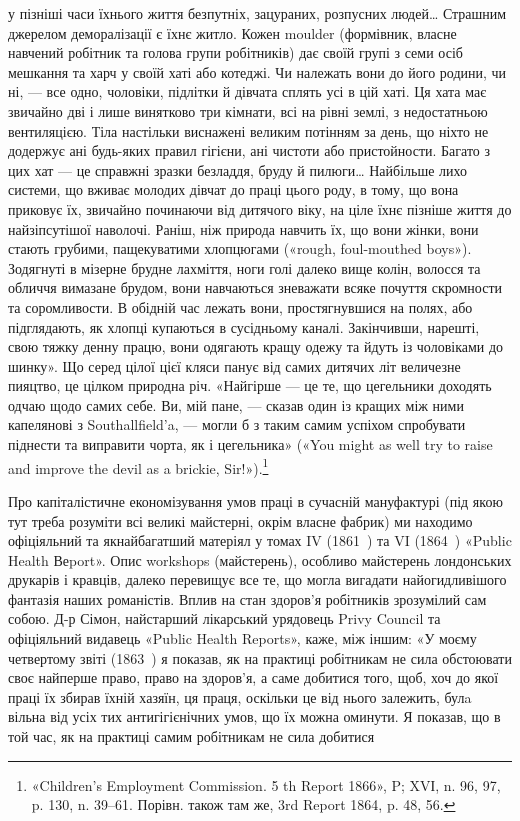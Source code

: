 \parcont{}  %
у пізніші часи їхнього життя безпутніх, зацураних, розпусних
людей\dots{} Страшним джерелом деморалізації є їхнє житло. Кожен
moulder (формівник, власне навчений робітник та голова групи
робітників) дає своїй групі з семи осіб мешкання та харч у своїй
хаті або котеджі. Чи належать вони до його родини, чи ні, — все
одно, чоловіки, підлітки й дівчата сплять усі в цій хаті. Ця хата
має звичайно дві і лише винятково три кімнати, всі на рівні землі,
з недостатньою вентиляцією. Тіла настільки виснажені великим
потінням за день, що ніхто не додержує ані будь-яких правил
гігієни, ані чистоти або пристойности. Багато з цих хат — це
справжні зразки безладдя, бруду й пилюги\dots{} Найбільше лихо
системи, що вживає молодих дівчат до праці цього роду, в тому,
що вона приковує їх, звичайно починаючи від дитячого віку, на
ціле їхнє пізніше життя до найзіпсутішої наволочі. Раніш, ніж
природа навчить їх, що вони жінки, вони стають грубими, пащекуватими
хлопцюгами («rough, foul-mouthed boys»). Зодягнуті
в мізерне брудне лахміття, ноги голі далеко вище колін, волосся
та обличчя вимазане брудом, вони навчаються зневажати всяке
почуття скромности та соромливости. В обідній час лежать вони,
простягнувшися на полях, або підглядають, як хлопці купаються
в сусідньому каналі. Закінчивши, нарешті, свою тяжку денну
працю, вони одягають кращу одежу та йдуть із чоловіками до
шинку». Що серед цілої цієї кляси панує від самих дитячих літ
величезне пияцтво, це цілком природна річ. «Найгірше — це те,
що цегельники доходять одчаю щодо самих себе. Ви, мій пане, —
сказав один із кращих між ними капелянові з Southallfield’a, —
могли б з таким самим успіхом спробувати піднести та виправити
чорта, як і цегельника» («You might as well try to raise and
improve the devil as a brickie, Sir!»).\footnote{
«Children’s Employment Commission. 5 th Report 1866», P; XVІ,
n. 96, 97, p. 130, n. 39--61. Порівн. також там же, 3rd Report 1864,
p. 48, 56.
}

Про капіталістичне економізування умов праці в сучасній
мануфактурі (під якою тут треба розуміти всі великі майстерні,
окрім власне фабрик) ми находимо офіціяльний та якнайбагатший
матеріял у томах IV (1861~) та VI (1864~) «Public Health Веport».
Опис workshops (майстерень), особливо майстерень лондонських
друкарів і кравців, далеко перевищує все те, що могла вигадати
найогидливішого фантазія наших романістів. Вплив на
стан здоров’я робітників зрозумілий сам собою. Д-р Сімон, найстарший
лікарський урядовець Privy Council та офіціяльний
видавець «Public Health Reports», каже, між іншим: «У моєму
четвертому звіті (1863~) я показав, як на практиці робітникам
не сила обстоювати своє найперше право, право на здоров’я,
а саме добитися того, щоб, хоч до якої праці їх збирав їхній хазяїн,
ця праця, оскільки це від нього залежить, булa вільна від
усіх тих антигігієнічних умов, що їх можна оминути. Я показав,
що в той час, як на практиці самим робітникам не сила добитися
\parbreak{}  %
